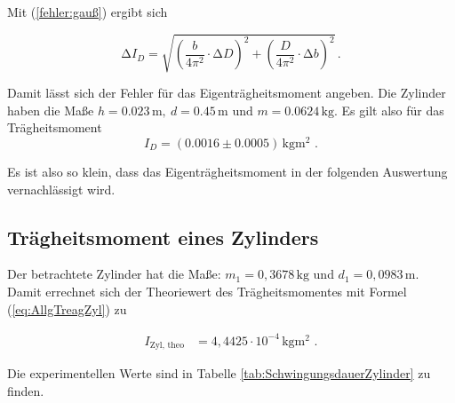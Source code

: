 Mit (\ref{fehler:gauß}) ergibt sich

\begin{equation*}
  \increment I_{D} = \sqrt{\left(\frac{b}{4 \pi^2} \cdot  \increment D\right)^2 + \left(\frac{D}{4 \pi^2} \cdot  \increment b\right)^2} \, .
\end{equation*}


Damit lässt sich der Fehler für das Eigenträgheitsmoment angeben.
Die Zylinder haben die Maße $h = 0.023 \, \unit{\meter}, \: d = 0.45 \, \unit{\meter} \text{ und } m = 0.0624 \, \unit{\kilo\gram}$.
Es gilt also für das Trägheitsmoment
\begin{equation*}
  I_{D} =  (0.0016 \pm 0.0005) \, \unit{\kilo\gram\meter\squared} \text{ .}
\end{equation*}

Es ist also so klein, dass das Eigenträgheitsmoment in der folgenden Auswertung vernachlässigt wird.


\subsection{Trägheitsmoment eines Zylinders}
\label{sec:TraegZylinder}

Der betrachtete Zylinder hat die Maße: $m_1 = 0,3678 \, \unit{\kilo\gram}$ und $d_1 = 0,0983 \, \unit{\meter}$.
Damit errechnet sich der Theoriewert des Trägheitsmomentes mit Formel (\ref{eq:AllgTreagZyl}) zu

\begin{align*}
  I_{\text{Zyl, theo}} &= 4,4425 \cdot 10^{-4} \, \unit{\kilo\gram\meter\squared} \text{ .}
\end{align*}

Die experimentellen Werte sind in Tabelle \ref{tab:SchwingungsdauerZylinder} zu finden.

